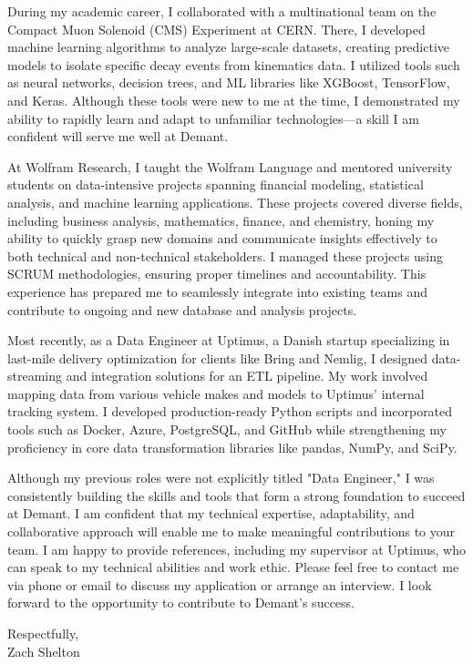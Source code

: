 \documentclass[11pt,a4]{article}
\begin{document}
During my academic career, I collaborated with a multinational team on the Compact Muon Solenoid (CMS) Experiment at CERN. There, I developed machine learning algorithms to analyze large-scale datasets, creating predictive models to isolate specific decay events from kinematics data. I utilized tools such as neural networks, decision trees, and ML libraries like XGBoost, TensorFlow, and Keras. Although these tools were new to me at the time, I demonstrated my ability to rapidly learn and adapt to unfamiliar technologies—a skill I am confident will serve me well at Demant.

At Wolfram Research, I taught the Wolfram Language and mentored university students on data-intensive projects spanning financial modeling, statistical analysis, and machine learning applications. These projects covered diverse fields, including business analysis, mathematics, finance, and chemistry, honing my ability to quickly grasp new domains and communicate insights effectively to both technical and non-technical stakeholders. I managed these projects using SCRUM methodologies, ensuring proper timelines and accountability. This experience has prepared me to seamlessly integrate into existing teams and contribute to ongoing and new database and analysis projects.

Most recently, as a Data Engineer at Uptimus, a Danish startup specializing in last-mile delivery optimization for clients like Bring and Nemlig, I designed data-streaming and integration solutions for an ETL pipeline. My work involved mapping data from various vehicle makes and models to Uptimus' internal tracking system. I developed production-ready Python scripts and incorporated tools such as Docker, Azure, PostgreSQL, and GitHub while strengthening my proficiency in core data transformation libraries like pandas, NumPy, and SciPy.

Although my previous roles were not explicitly titled "Data Engineer," I was consistently building the skills and tools that form a strong foundation to succeed at Demant. I am confident that my technical expertise, adaptability, and collaborative approach will enable me to make meaningful contributions to your team. I am happy to provide references, including my supervisor at Uptimus, who can speak to my technical abilities and work ethic. Please feel free to contact me via phone or email to discuss my application or arrange an interview. I look forward to the opportunity to contribute to Demant's success.
\par

\vspace{0.5cm}
\raggedright
Respectfully, \\ 
Zach Shelton \\ 
\end{document}
